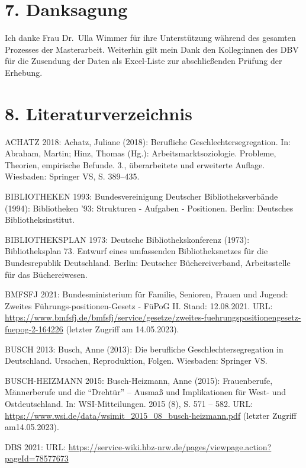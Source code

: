 \documentclass[a4paper,
fontsize=11pt,
oneside,
numbers=noperiodatend,
parskip=half-,
bibliography=totoc,
final
]{scrartcl}
\begin{document}
\hypertarget{danksagung}{%
\section{7. Danksagung}\label{danksagung}}

Ich danke Frau Dr.~Ulla Wimmer für ihre Unterstützung während des
gesamten Prozesses der Masterarbeit. Weiterhin gilt mein Dank den
Kolleg:innen des DBV für die Zusendung der Daten als Excel-Liste zur
abschließenden Prüfung der Erhebung.

\hypertarget{literaturverzeichnis}{%
\section{8. Literaturverzeichnis}\label{literaturverzeichnis}}

ACHATZ 2018: Achatz, Juliane (2018): Berufliche Geschlechtersegregation.
In: Abraham, Martin; Hinz, Thomas (Hg.): Arbeitsmarktsoziologie.
Probleme, Theorien, empirische Befunde. 3., überarbeitete und erweiterte
Auflage. Wiesbaden: Springer VS, S. 389--435.

BIBLIOTHEKEN 1993: Bundesvereinigung Deutscher Bibliotheksverbände
(1994): Bibliotheken '93: Strukturen - Aufgaben - Positionen. Berlin:
Deutsches Bibliotheksinstitut.

BIBLIOTHEKSPLAN 1973: Deutsche Bibliothekskonferenz (1973):
Bibliotheksplan 73. Entwurf eines umfassenden Bibliotheksnetzes für die
Bundesrepublik Deutschland. Berlin: Deutscher Büchereiverband,
Arbeitsstelle für das Büchereiwesen.

BMFSFJ 2021: Bundesministerium für Familie, Senioren, Frauen und Jugend:
Zweites Führungs-positionen-Gesetz - FüPoG II. Stand: 12.08.2021. URL:
\url{https://www.bmfsfj.de/bmfsfj/service/gesetze/zweites-fuehrungspositionengesetz-fuepog-2-164226}
(letzter Zugriff am 14.05.2023).

BUSCH 2013: Busch, Anne (2013): Die berufliche Geschlechtersegregation
in Deutschland. Ursachen, Reproduktion, Folgen. Wiesbaden: Springer VS.

BUSCH-HEIZMANN 2015: Busch-Heizmann, Anne (2015): Frauenberufe,
Männerberufe und die \enquote{Drehtür} -- Ausmaß und Implikationen für
West- und Ostdeutschland. In: WSI-Mitteilungen. 2015 (8), S. 571 -- 582.
URL: \url{https://www.wsi.de/data/wsimit_2015_08_busch-heizmann.pdf}
(letzter Zugriff am14.05.2023).

DBS 2021: URL:
\url{https://service-wiki.hbz-nrw.de/pages/viewpage.action?pageId=78577673}
\end{document}
